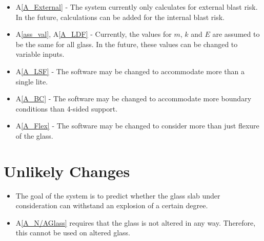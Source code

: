\documentclass[12pt]{article}
\newcommand{\aref}[1]{A\ref{#1}}
\newcounter{lcnum} %
\newcounter{ucnum} %
\newcommand{\utheucnum}{UC\theucnum}
\begin{document}
\noindent \begin{itemize}

\item[LC\refstepcounter{lcnum}\thelcnum\label{LC_int}:] \aref{A_External} - The
  system currently only calculates for external blast risk. In the future,
  calculations can be added for the internal blast risk.


\item[LC\refstepcounter{lcnum}\thelcnum\label{LC_variables}:] \aref{ass_val},
  \aref{A_LDF} - Currently, the values for $m$, $k$ and $E$ are assumed to be the
  same for all glass.  In the future, these values can be changed to variable
  inputs.

\item[LC\refstepcounter{lcnum}\thelcnum\label{LC_lite}:] \aref{A_LSF} - The
  software may be changed to accommodate more than a single lite.

\item[LC\refstepcounter{lcnum}\thelcnum\label{LC_BC}:] \aref{A_BC} - The
  software may be changed to accommodate more boundary conditions than 4-sided
  support.

\item[LC\refstepcounter{lcnum}\thelcnum\label{LC_Flex}:] \aref{A_Flex} - The
  software may be changed to consider more than just flexure of the glass.


\end{itemize}

\section{Unlikely Changes} \label{sec_unlike}

\noindent \begin{itemize}

\item[\refstepcounter{ucnum} \utheucnum \label{ucGoal}:] The goal of the system
  is to predict whether the glass slab under consideration can withstand an 
  explosion of a certain degree.
\item[\refstepcounter{ucnum} \utheucnum \label{ucN/AGlass}:] \aref{A_N/AGlass} requires that the glass is not altered in any way. Therefore, this cannot be used on altered glass.

\end{itemize}
\end{document}
